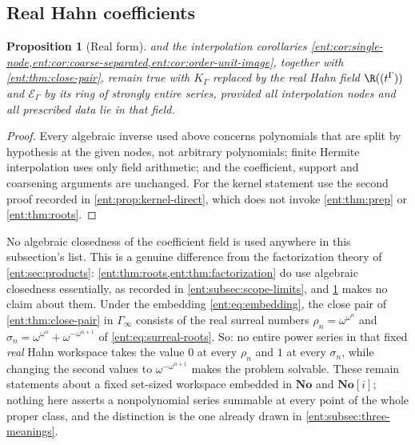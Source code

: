 \documentclass[11pt]{article}
\theoremstyle{plain}
\theoremstyle{plain}
\newtheorem{proposition}[proposition]{Proposition}
\theoremstyle{plain}
\theoremstyle{definition}
\theoremstyle{definition}
\theoremstyle{definition}
\theoremstyle{definition}
\theoremstyle{remark}
\newcommand{\No}{\mathbf{No}}
\newcommand{\K}{K_\Gamma}\newcommand{\KD}{K_\Delta}
\newcommand{\E}{\mathcal E_\Gamma}
\begin{document}
\subsection{Real Hahn coefficients}
\begin{proposition}[Real form]\label{ent:prop:real-form}
 and the
interpolation corollaries
\cref{ent:cor:single-node,ent:cor:coarse-separated,ent:cor:order-unit-image},
together with \cref{ent:thm:close-pair}, remain true with $\K$ replaced by the
real Hahn field $\R((t^\Gamma))$ and $\E$ by its ring of strongly entire
series, provided all interpolation nodes and all prescribed data lie in that
field.
\end{proposition}
\begin{proof}
Every algebraic inverse used above concerns polynomials that are split by
hypothesis at the given nodes, not arbitrary polynomials; finite Hermite
interpolation uses only field arithmetic; and the coefficient, support and
coarsening arguments are unchanged. For the kernel statement use the second
proof recorded in \cref{ent:prop:kernel-direct}, which does not invoke
\cref{ent:thm:prep} or \cref{ent:thm:roots}.
\end{proof}

No algebraic closedness of the coefficient field is used anywhere in this
subsection's list. This is a genuine difference from the factorization theory
of \cref{ent:sec:products}: \cref{ent:thm:roots,ent:thm:factorization} do use
algebraic closedness essentially, as recorded in
\cref{ent:subsec:scope-limits}, and \cref{ent:prop:real-form} makes no claim
about them. Under the embedding \eqref{ent:eq:embedding}, the close pair of
\cref{ent:thm:close-pair} in $\Gamma_\infty$ consists of the real surreal
numbers $\rho_n=\omega^{\omega^n}$ and
$\sigma_n=\omega^{\omega^n}+\omega^{-\omega^{n+1}}$ of
\eqref{ent:eq:surreal-roots}. So: no entire power series in that fixed
\emph{real} Hahn workspace takes the value $0$ at every $\rho_n$ and $1$ at
every $\sigma_n$, while changing the second values to $\omega^{-\omega^{n+1}}$
makes the problem solvable. These remain statements about a fixed set-sized
workspace embedded in $\No$ and $\No[i]$; nothing here asserts a nonpolynomial
series summable at every point of the whole proper class, and the
distinction is the one already drawn in \cref{ent:subsec:three-meanings}.
\end{document}
